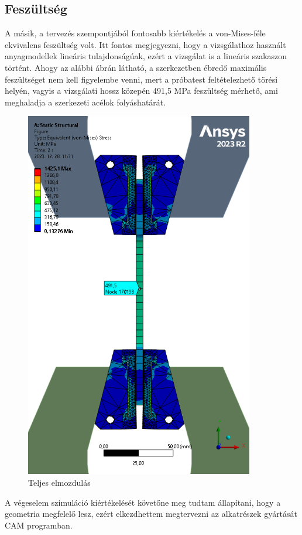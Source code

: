 \documentclass[12pt,a4paper,oneside]{report}
\begin{document}
\subsection{Feszültség}
A másik, a tervezés szempontjából fontosabb kiértékelés a von-Mises-féle ekvivalens feszültség volt. Itt fontos megjegyezni, hogy a vizsgálathoz használt anyagmodellek lineáris tulajdonságúak, ezért a vizsgálat is a lineáris szakaszon történt. Ahogy az alábbi ábrán látható, a szerkezetben ébredő maximális feszültséget nem kell figyelembe venni, mert a próbatest feltételezhető törési helyén, vagyis a vizsgálati hossz közepén 491,5 MPa feszültség mérhető, ami meghaladja a szerkezeti acélok folyáshatárát.

\begin{figure}[H]
    \centering
    \includegraphics[width=10cm]{figures/mesh_6.png}
    \caption{Teljes elmozdulás}
    \label{Fig:mesh_6}
\end{figure}

A végeselem szimuláció kiértékelését követőne meg tudtam állapítani, hogy a geometria megfelelő lesz, ezért elkezdhettem megtervezni az alkatrészek gyártását CAM programban.
\end{document}

